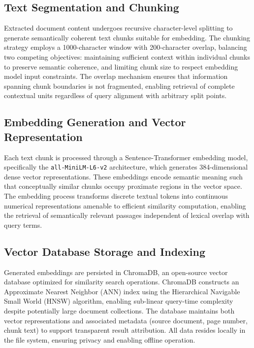\subsection{Text Segmentation and Chunking}

Extracted document content undergoes recursive character-level splitting to generate semantically coherent text chunks suitable for embedding. The chunking strategy employs a 1000-character window with 200-character overlap, balancing two competing objectives: maintaining sufficient context within individual chunks to preserve semantic coherence, and limiting chunk size to respect embedding model input constraints. The overlap mechanism ensures that information spanning chunk boundaries is not fragmented, enabling retrieval of complete contextual units regardless of query alignment with arbitrary split points.

\subsection{Embedding Generation and Vector Representation}

Each text chunk is processed through a Sentence-Transformer embedding model, specifically the \texttt{all-MiniLM-L6-v2} architecture, which generates 384-dimensional dense vector representations. These embeddings encode semantic meaning such that conceptually similar chunks occupy proximate regions in the vector space. The embedding process transforms discrete textual tokens into continuous numerical representations amenable to efficient similarity computation, enabling the retrieval of semantically relevant passages independent of lexical overlap with query terms.

\subsection{Vector Database Storage and Indexing}

Generated embeddings are persisted in ChromaDB, an open-source vector database optimized for similarity search operations. ChromaDB constructs an Approximate Nearest Neighbor (ANN) index using the Hierarchical Navigable Small World (HNSW) algorithm, enabling sub-linear query-time complexity despite potentially large document collections. The database maintains both vector representations and associated metadata (source document, page number, chunk text) to support transparent result attribution. All data resides locally in the file system, ensuring privacy and enabling offline operation.

